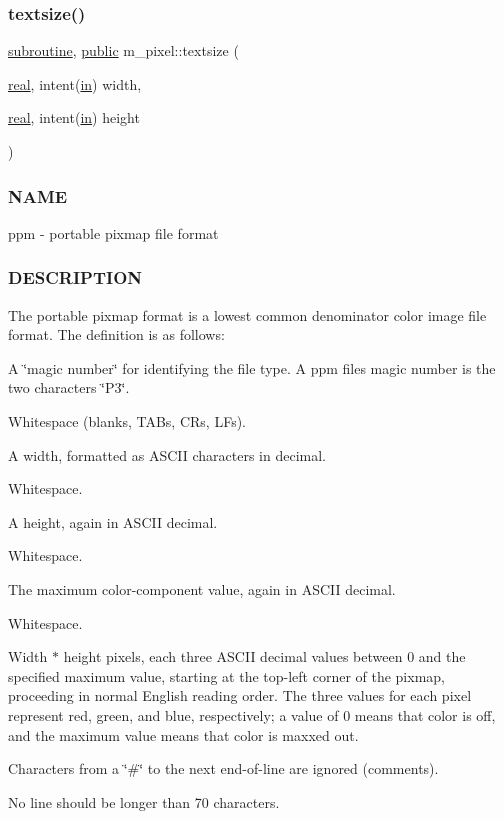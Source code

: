 \subsubsection{\texorpdfstring{textsize()}{textsize()}}
{\footnotesize\ttfamily \hyperlink{M__stopwatch_83_8txt_acfbcff50169d691ff02d4a123ed70482}{subroutine}, \hyperlink{M__stopwatch_83_8txt_a2f74811300c361e53b430611a7d1769f}{public} m\+\_\+pixel\+::textsize (\begin{DoxyParamCaption}\item[{\hyperlink{read__watch_83_8txt_abdb62bde002f38ef75f810d3a905a823}{real}, intent(\hyperlink{M__journal_83_8txt_afce72651d1eed785a2132bee863b2f38}{in})}]{width,  }\item[{\hyperlink{read__watch_83_8txt_abdb62bde002f38ef75f810d3a905a823}{real}, intent(\hyperlink{M__journal_83_8txt_afce72651d1eed785a2132bee863b2f38}{in})}]{height }\end{DoxyParamCaption})}



\subsubsection*{N\+A\+ME}

ppm -\/ portable pixmap file format 

\subsubsection*{D\+E\+S\+C\+R\+I\+P\+T\+I\+ON}

The portable pixmap format is a lowest common denominator color image file format. The definition is as follows\+:


\begin{DoxyItemize}
\item A \char`\"{}magic number\char`\"{} for identifying the file type. A ppm file\textquotesingle{}s magic number is the two characters \char`\"{}\+P3\char`\"{}.
\item Whitespace (blanks, T\+A\+Bs, C\+Rs, L\+Fs).
\item A width, formatted as A\+S\+C\+II characters in decimal.
\item Whitespace.
\item A height, again in A\+S\+C\+II decimal.
\item Whitespace.
\item The maximum color-\/component value, again in A\+S\+C\+II decimal.
\item Whitespace.
\item Width $\ast$ height pixels, each three A\+S\+C\+II decimal values between 0 and the specified maximum value, starting at the top-\/left corner of the pixmap, proceeding in normal English reading order. The three values for each pixel represent red, green, and blue, respectively; a value of 0 means that color is off, and the maximum value means that color is maxxed out.
\item Characters from a \char`\"{}\#\char`\"{} to the next end-\/of-\/line are ignored (comments).
\item No line should be longer than 70 characters.
\end{DoxyItemize}

